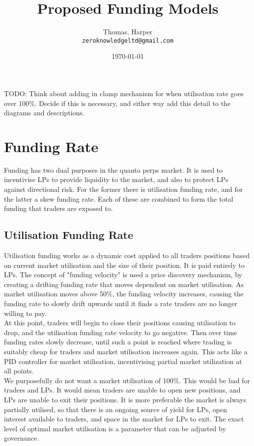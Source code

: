 \documentclass[]{article}
\title{Proposed Funding Models}
\author{
  Thomas, Harper\\
  \texttt{zeroknowledgeltd@gmail.com}
}
\date{\today}
\begin{document}
\maketitle

TODO: Think about adding in clamp mechanism for when utilisation rate goes over 100\%. Decide if this is necessary, and either way add this detail to the diagrams and descriptions.

\section{Funding Rate}

Funding has two dual purposes in the quanto perps market. It is used to incentivise LPs to provide liquidity to the market, and also to protect LPs against directional risk. For the former there is utilisation funding rate, and for the latter a skew funding rate. Each of these are combined to form the total funding that traders are exposed to.

\subsection{Utilisation Funding Rate}

Utilisation funding works as a dynamic cost applied to all traders positions based on current market utilisation and the size of their position. It is paid entirely to LPs. The concept of "funding velocity" is used a price discovery mechanism, by creating a drifting funding rate that moves dependent on market utilisation. As market utilisation moves above 50\%, the funding velocity increases, causing the funding rate to slowly drift upwards until it finds a rate traders are no longer willing to pay.\\

At this point, traders will begin to close their positions causing utilisation to drop, and the utilisation funding rate velocity to go negative. Then over time funding rates slowly decrease, until such a point is reached where trading is suitably cheap for traders and market utilisation increases again. This acts like a PID controller for market utilisation, incentivising partial market utilization at all points.\\

We purposefully do not want a market utilisation of 100\%. This would be bad for traders and LPs. It would mean traders are unable to open new positions, and LPs are unable to exit their positions. It is more preferable the market is always partially utilised, so that there is an ongoing source of yield for LPs, open interest available to traders, and space in the market for LPs to exit. The exact level of optimal market utilisation is a parameter that can be adjusted by governance.\\
\end{document}
